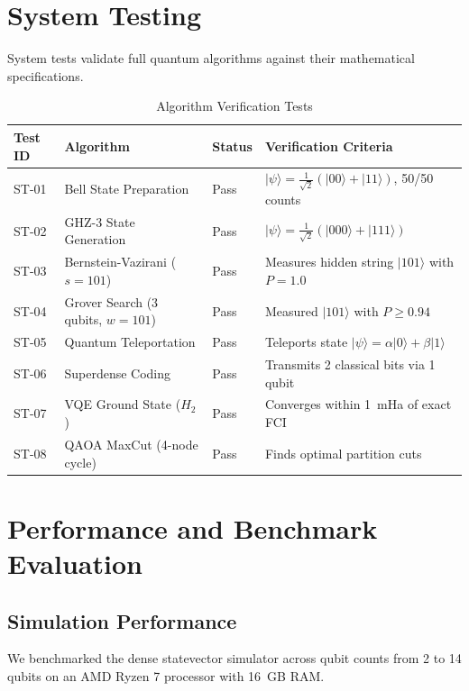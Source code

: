 \section{System Testing}
System tests validate full quantum algorithms against their mathematical specifications.

\begin{table}[h!]
\centering
\caption{Algorithm Verification Tests}
\label{tab:algo_tests}
\begin{tabular}{|p{2cm}|p{5cm}|p{2cm}|p{3.5cm}|}
\hline
\textbf{Test ID} & \textbf{Algorithm} & \textbf{Status} & \textbf{Verification Criteria} \\
\hline
ST-01 & Bell State Preparation & Pass & $|\psi\rangle = \frac{1}{\sqrt{2}}(|00\rangle + |11\rangle)$, 50/50 counts \\
\hline
ST-02 & GHZ-3 State Generation & Pass & $|\psi\rangle = \frac{1}{\sqrt{2}}(|000\rangle + |111\rangle)$ \\
\hline
ST-03 & Bernstein-Vazirani ($s=101$) & Pass & Measures hidden string $|101\rangle$ with $P=1.0$ \\
\hline
ST-04 & Grover Search (3 qubits, $w=101$) & Pass & Measured $|101\rangle$ with $P \ge 0.94$ \\
\hline
ST-05 & Quantum Teleportation & Pass & Teleports state $|\psi\rangle = \alpha|0\rangle + \beta|1\rangle$ \\
\hline
ST-06 & Superdense Coding & Pass & Transmits 2 classical bits via 1 qubit \\
\hline
ST-07 & VQE Ground State ($H_2$) & Pass & Converges within 1~mHa of exact FCI \\
\hline
ST-08 & QAOA MaxCut (4-node cycle) & Pass & Finds optimal partition cuts \\
\hline
\end{tabular}
\end{table}

\section{Performance and Benchmark Evaluation}

\subsection{Simulation Performance}
We benchmarked the dense statevector simulator across qubit counts from 2 to 14 qubits on an AMD Ryzen 7 processor with 16~GB RAM.

